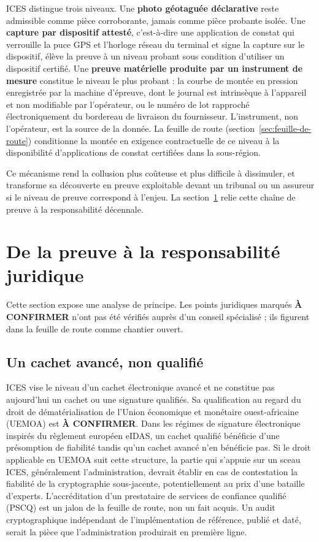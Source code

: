 \documentclass[11pt,a4paper]{article}
\newcommand{\aconfirmer}{\textbf{\color{rouge}À CONFIRMER}}
\begin{document}
ICES distingue trois niveaux. Une \textbf{photo géotaguée déclarative} reste admissible comme pièce corroborante, jamais comme pièce probante isolée. Une \textbf{capture par dispositif attesté}, c'est-à-dire une application de constat qui verrouille la puce GPS et l'horloge réseau du terminal et signe la capture sur le dispositif, élève la preuve à un niveau probant sous condition d'utiliser un dispositif certifié. Une \textbf{preuve matérielle produite par un instrument de mesure} constitue le niveau le plus probant : la courbe de montée en pression enregistrée par la machine d'épreuve, dont le journal est intrinsèque à l'appareil et non modifiable par l'opérateur, ou le numéro de lot rapproché électroniquement du bordereau de livraison du fournisseur. L'instrument, non l'opérateur, est la source de la donnée. La feuille de route (section~\ref{sec:feuille-de-route}) conditionne la montée en exigence contractuelle de ce niveau à la disponibilité d'applications de constat certifiées dans la sous-région.

Ce mécanisme rend la collusion plus coûteuse et plus difficile à dissimuler, et transforme sa découverte en preuve exploitable devant un tribunal ou un assureur si le niveau de preuve correspond à l'enjeu. La section~\ref{sec:juridique} relie cette chaîne de preuve à la responsabilité décennale.


\section{De la preuve à la responsabilité juridique}\label{sec:juridique}

Cette section expose une analyse de principe. Les points juridiques marqués \aconfirmer{} n'ont pas été vérifiés auprès d'un conseil spécialisé ; ils figurent dans la feuille de route comme chantier ouvert.

\subsection{Un cachet avancé, non qualifié}

ICES vise le niveau d'un cachet électronique avancé et ne constitue pas aujourd'hui un cachet ou une signature qualifiés. Sa qualification au regard du droit de dématérialisation de l'Union économique et monétaire ouest-africaine (UEMOA) est \aconfirmer. Dans les régimes de signature électronique inspirés du règlement européen eIDAS, un cachet qualifié bénéficie d'une présomption de fiabilité tandis qu'un cachet avancé n'en bénéficie pas. Si le droit applicable en UEMOA suit cette structure, la partie qui s'appuie sur un sceau ICES, généralement l'administration, devrait établir en cas de contestation la fiabilité de la cryptographie sous-jacente, potentiellement au prix d'une bataille d'experts. L'accréditation d'un prestataire de services de confiance qualifié (PSCQ) est un jalon de la feuille de route, non un fait acquis. Un audit cryptographique indépendant de l'implémentation de référence, publié et daté, serait la pièce que l'administration produirait en première ligne.
\end{document}
